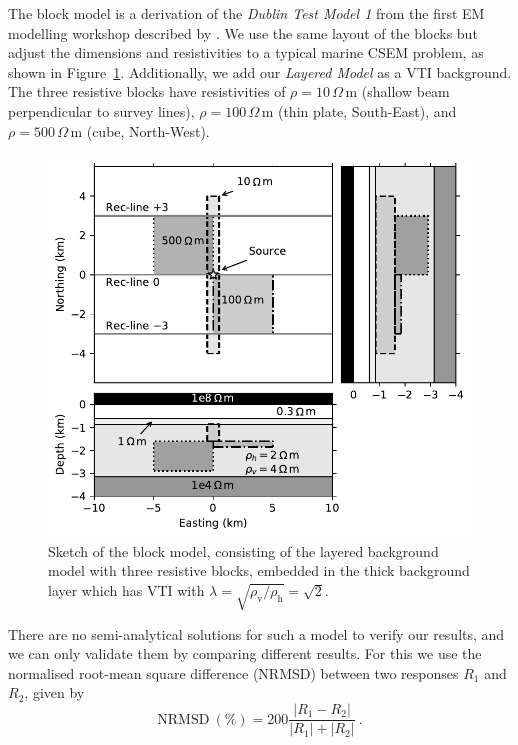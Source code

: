 \documentclass[onecolumn,extra,camera]{gji}
\newcommand{\mr}[1]{\mathrm{#1}}
\newcommand{\ohmm}{\ensuremath{\Omega\,}\text{m}\xspace}
\begin{document}
The block model is a derivation of the \emph{Dublin Test Model 1} from the first EM modelling workshop described by \cite{GJI.13.Miensopust}. We use the same layout of the blocks but adjust the dimensions and resistivities to a typical marine CSEM problem, as shown in Figure~\ref{fig:model-block}. Additionally, we add our \emph{Layered Model} as a VTI background. The three resistive blocks have resistivities of $\rho=10\,\ohmm$ (shallow beam perpendicular to survey lines), $\rho=100\,\ohmm$ (thin plate, South-East), and $\rho=500\,\ohmm$ (cube, North-West).
%
\begin{figure}
  \centering
  \includegraphics[width=.6\linewidth]{figures/model-block}
  \caption{Sketch of the block model, consisting of the layered background model with three resistive blocks, embedded in the thick background layer which has VTI with $\lambda=\sqrt{\rho_\textrm{v}/\rho_\textrm{h}}=\sqrt{2}$.}
  \label{fig:model-block}
\end{figure}
%

There are no semi-analytical solutions for such a model to verify our results, and we can only validate them by comparing different results. For this we use the normalised root-mean square difference (NRMSD) between two responses $R_1$ and $R_2$, given by
%
\begin{equation}
  \mr{NRMSD~(\%)} = 200 \frac{|R_1 - R_2|}{|R_1| + |R_2|}\ .
  \label{eq:nrmsd}
\end{equation}
%
\end{document}
